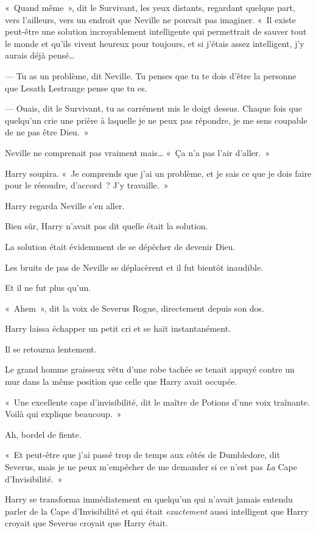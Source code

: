 «~Quand même~», dit le Survivant, les yeux distants, regardant quelque part, vers l'ailleurs, vers un endroit que Neville ne pouvait pas imaginer.
«~Il existe peut-être une solution incroyablement intelligente qui permettrait de sauver tout le monde et qu'ils vivent heureux pour toujours, et si j'étais assez intelligent, j'y aurais déjà pensé…

--- Tu as un problème, dit Neville.
Tu penses que tu te dois d'être la personne que Lesath Lestrange pense que tu es.

--- Ouais, dit le Survivant, tu as carrément mis le doigt dessus.
Chaque fois que quelqu'un crie une prière à laquelle je ne peux pas répondre, je me sens coupable de ne pas être Dieu.~»

Neville ne comprenait pas vraiment mais…
«~Ça n'a pas l'air d'aller.~»

Harry soupira.
«~Je comprends que j'ai un problème, et je sais ce que je dois faire pour le résoudre, d'accord~?
J'y travaille.~»

\later

Harry regarda Neville s'en aller.

Bien sûr, Harry n'avait pas dit quelle était la solution.

La solution était évidemment de se dépêcher de devenir Dieu.

Les bruits de pas de Neville se déplacèrent et il fut bientôt inaudible.

Et il ne fut plus qu'un.

«~Ahem~», dit la voix de Severus Rogue, directement depuis son dos.

Harry laissa échapper un petit cri et se haït instantanément.

Il se retourna lentement.

Le grand homme graisseux vêtu d’une robe tachée se tenait appuyé contre un mur dans la même position que celle que Harry avait occupée.

«~Une excellente cape d'invisibilité, dit le maître de Potions d'une voix traînante.
Voilà qui explique beaucoup.~»

Ah, bordel de fiente.

«~Et peut-être que j'ai passé trop de temps aux côtés de Dumbledore, dit Severus, mais je ne peux m'empêcher de me demander si ce n'est pas \emph{La} Cape d'Invisibilité.~»

Harry se transforma immédiatement en quelqu'un qui n'avait jamais entendu parler de la Cape d'Invisibilité et qui était \emph{exactement} aussi intelligent que Harry croyait que Severus croyait que Harry était.

